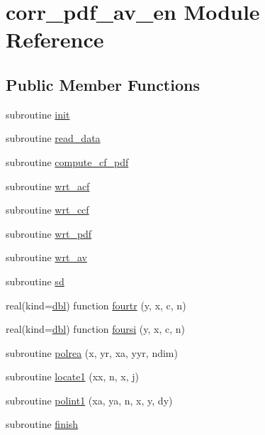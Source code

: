 \hypertarget{classcorr__pdf__av__en}{\section{corr\+\_\+pdf\+\_\+av\+\_\+en Module Reference}
\label{classcorr__pdf__av__en}
}
\subsection*{Public Member Functions}
\begin{DoxyCompactItemize}
\item 
subroutine \hyperlink{classcorr__pdf__av__en_aae48c727239a24c0522162733ae7c3b4}{init}
\item 
subroutine \hyperlink{classcorr__pdf__av__en_a03bb605d5daea624b42c2465a54cfe8b}{read\+\_\+data}
\item 
subroutine \hyperlink{classcorr__pdf__av__en_a80e8f9f05fa1fee2f0eca9f220ff655b}{compute\+\_\+cf\+\_\+pdf}
\item 
subroutine \hyperlink{classcorr__pdf__av__en_ab5b43747a8b12db73be600aab368061a}{wrt\+\_\+acf}
\item 
subroutine \hyperlink{classcorr__pdf__av__en_adbb98e5e952288212f4c55ebb87d4ea4}{wrt\+\_\+ccf}
\item 
subroutine \hyperlink{classcorr__pdf__av__en_aae7dec838b1dda492940cc092a4f230d}{wrt\+\_\+pdf}
\item 
subroutine \hyperlink{classcorr__pdf__av__en_a2a4a88ee12f03fd4cd6cbc6bc6a1891f}{wrt\+\_\+av}
\item 
subroutine \hyperlink{classcorr__pdf__av__en_ad3f51531aaf874bf7988d0912018a77e}{sd}
\item 
real(kind=\hyperlink{classcorr__pdf__av__en_a411e74f2fd514aedb12054b21e1d7c58}{dbl}) function \hyperlink{classcorr__pdf__av__en_aaf6c819052274b26076d2711a36b419d}{fourtr} (y, x, c, n)
\item 
real(kind=\hyperlink{classcorr__pdf__av__en_a411e74f2fd514aedb12054b21e1d7c58}{dbl}) function \hyperlink{classcorr__pdf__av__en_a78476adcf46c53c16bf61ed1de16d827}{foursi} (y, x, c, n)
\item 
subroutine \hyperlink{classcorr__pdf__av__en_ab6d6b1ed7e04e4e8f4645324d10bb351}{polrea} (x, yr, xa, yyr, ndim)
\item 
subroutine \hyperlink{classcorr__pdf__av__en_add09b1cb121d67fa34b9011889d965a8}{locate1} (xx, n, x, \hyperlink{classcorr__pdf__av__en_a005d609e5703c09a8cf674cc770f729c}{j})
\item 
subroutine \hyperlink{classcorr__pdf__av__en_ad94d0769087b248f45a3fa966b6104b8}{polint1} (xa, ya, n, x, y, dy)
\item 
subroutine \hyperlink{classcorr__pdf__av__en_aec79d698dedcef263a352e7df8acbed2}{finish}
\end{DoxyCompactItemize}
